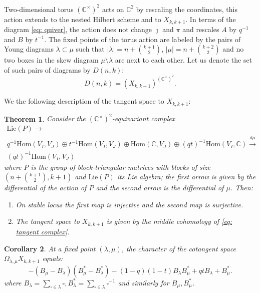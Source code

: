 \documentclass[12pt]{amsart}
\newcommand{\C}{\mathbb{C}}
\newcommand{\Hom}{\mathrm{Hom}}
\numberwithin{equation}{section}
\newtheorem{theorem}{Theorem}[section]
\newtheorem{corollary}[theorem]{Corollary}
\theoremstyle{definition}
\newcommand{\sq}{\square}
\begin{document}
Two-dimensional torus $(\C^{\times})^2$ acts on $\C^2$ by rescaling the coordinates, this action extends to the nested Hilbert scheme and to $X_{k,k+1}$. In terms of the diagram \eqref{eq: quiver}, the action does not change $\jmath$ and $\pi$ and rescales $A$ by $q^{-1}$ and $B$ by $t^{-1}.$  %
The fixed points of the torus action are labeled by the pairs of Young diagrams $\lambda\subset \mu$ such that $|\lambda|=n+\binom{k+1}{2}$, $|\mu|=n+\binom{k+2}{2}$ and no two boxes in the skew diagram $\mu\setminus \lambda$ are next to each other.  Let us denote the set of such pairs of diagrams by \(D(n,k)\):
\[D(n,k)=(X_{k,k+1})^{(\C^\times)^2}.\]


We the following description of the tangent space to $X_{k,k+1}$:

\begin{theorem}\cite[Theorem 2.23]{GGS}
Consider the $(\C^{\times})^2$-equivariant complex 
\begin{multline}
\label{eq: tangent complex}
\mathrm{Lie}(P)\rightarrow \\q^{-1}\Hom(V_I,V_J)\oplus t^{-1}\Hom(V_{I},V_J)\oplus \Hom(\C,V_J)\oplus (qt)^{-1}\Hom(V_I,\C)\xrightarrow{d\mu}\\
 (qt)^{-1}\Hom(V_I,V_J)
\end{multline}
where $P$ is the group of block-triangular matrices with blocks of size $(n+\binom{k+1}{2},k+1)$ and $\mathrm{Lie}(P)$ its Lie algebra; the first arrow is given by the differential of the action of $P$ and the second arrow is the differential of $\mu$. Then:
\begin{enumerate}
\item[(a)] On stable locus the first map is injective and the second map is surjective.
\item[(b)] The tangent space to $X_{k,k+1}$ is given by the middle cohomology of \eqref{eq: tangent complex}.
\end{enumerate}
\end{theorem}

 
\begin{corollary}
At a fixed point $(\lambda,\mu)$, the character of the cotangent space $\Omega_{\lambda,\mu}X_{k,k+1}$ equals:
\begin{equation}
\label{eq: localization weight}
-(B_{\mu}-B_{\lambda})(B_{\mu}^{\ast}-B_{\lambda}^{\ast})-(1-q)(1-t)B_{\lambda}B_{\mu}^{\ast}+qtB_{\lambda}+B_{\mu}^{\ast}.
\end{equation}
where 
$B_{\lambda}=\sum_{\sq\in \lambda}\sq,
B_{\lambda}^{\ast}=\sum_{\sq\in \lambda}\sq^{-1}$ and similarly for $B_{\mu},B_{\mu}^{\ast}$.
\end{corollary}
\end{document}
